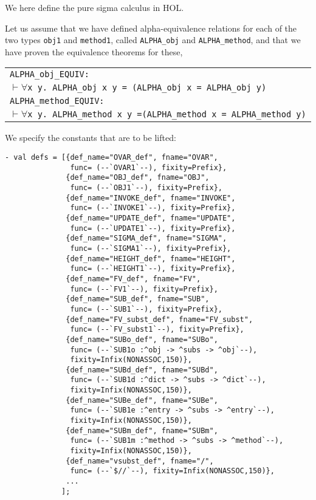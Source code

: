 \documentclass[envcountsame,runningheads]{llncs}
\begin{document}
We here define the pure sigma calculus in HOL.

Let us assume
that we have defined alpha-equivalence relations for each of the two types
{\tt obj1}
and {\tt method1}, called
{\tt ALPHA\_obj}
and {\tt ALPHA\_method},
and that we have proven the
equivalence theorems for these,
\begin{center}
\begin{tabular}{l}
{\tt ALPHA\_obj\_EQUIV:} \\
\hspace{0.9cm}
{\tt $\vdash \forall$x y. ALPHA\_obj x y = (ALPHA\_obj x = ALPHA\_obj y)} \\
{\tt ALPHA\_method\_EQUIV:} \\
\hspace{0.9cm}
{\tt $\vdash \forall$x y. ALPHA\_method x y =\;(ALPHA\_method x = ALPHA\_method y)}
\end{tabular}
\end{center}

We specify the constants that are to be lifted:
\begin{verbatim}
- val defs = [{def_name="OVAR_def", fname="OVAR",
               func= (--`OVAR1`--), fixity=Prefix},
              {def_name="OBJ_def", fname="OBJ",
               func= (--`OBJ1`--), fixity=Prefix},
              {def_name="INVOKE_def", fname="INVOKE",
               func= (--`INVOKE1`--), fixity=Prefix},
              {def_name="UPDATE_def", fname="UPDATE",
               func= (--`UPDATE1`--), fixity=Prefix},
              {def_name="SIGMA_def", fname="SIGMA",
               func= (--`SIGMA1`--), fixity=Prefix},
              {def_name="HEIGHT_def", fname="HEIGHT",
               func= (--`HEIGHT1`--), fixity=Prefix},
              {def_name="FV_def", fname="FV",
               func= (--`FV1`--), fixity=Prefix},
              {def_name="SUB_def", fname="SUB",
               func= (--`SUB1`--), fixity=Prefix},
              {def_name="FV_subst_def", fname="FV_subst",
               func= (--`FV_subst1`--), fixity=Prefix},
              {def_name="SUBo_def", fname="SUBo",
               func= (--`SUB1o :^obj -> ^subs -> ^obj`--),
               fixity=Infix(NONASSOC,150)},
              {def_name="SUBd_def", fname="SUBd",
               func= (--`SUB1d :^dict -> ^subs -> ^dict`--),
               fixity=Infix(NONASSOC,150)},
              {def_name="SUBe_def", fname="SUBe",
               func= (--`SUB1e :^entry -> ^subs -> ^entry`--),
               fixity=Infix(NONASSOC,150)},
              {def_name="SUBm_def", fname="SUBm",
               func= (--`SUB1m :^method -> ^subs -> ^method`--),
               fixity=Infix(NONASSOC,150)},
              {def_name="vsubst_def", fname="/",
               func= (--`$//`--), fixity=Infix(NONASSOC,150)},
              ...
             ];
\end{verbatim}
\end{document}
